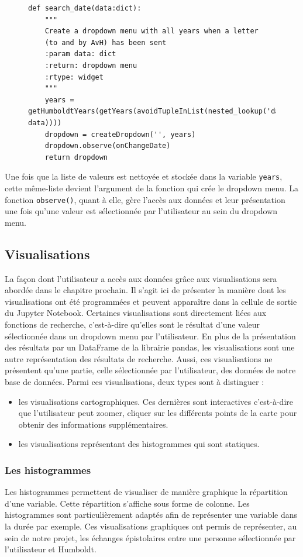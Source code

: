 \documentclass[a4paper, 12pt, twoside]{book}
\begin{document}
\begin{figure}[h!]
\begin{lstlisting}
def search_date(data:dict):
    """
    Create a dropdown menu with all years when a letter 
    (to and by AvH) has been sent
    :param data: dict 
    :return: dropdown menu
    :rtype: widget
    """
    years = getHumboldtYears(getYears(avoidTupleInList(nested_lookup('date', data))))
    dropdown = createDropdown('', years)
    dropdown.observe(onChangeDate)
    return dropdown
\end{lstlisting}
\vspace{-25pt}
\end{figure}

Une fois que la liste de valeurs est nettoyée et stockée dans la variable \texttt{years}, cette même-liste devient l'argument de la fonction qui crée le dropdown menu. La fonction \texttt{observe()}, quant à elle, gère l'accès aux données et leur présentation une fois qu'une valeur est sélectionnée par l'utilisateur au sein du dropdown menu. 

\subsection{Visualisations}
La façon dont l'utilisateur a accès aux données grâce aux visualisations sera abordée dans le chapitre prochain. Il s'agit ici de présenter la manière dont les visualisations ont été programmées et peuvent apparaître dans la cellule de sortie du Jupyter Notebook. 
Certaines visualisations sont directement liées aux fonctions de recherche, c'est-à-dire qu'elles sont le résultat d'une valeur sélectionnée dans un dropdown menu par l'utilisateur. En plus de la présentation des résultats par un DataFrame de la librairie pandas, les visualisations sont une autre représentation des résultats de recherche. Aussi, ces visualisations ne présentent qu'une partie, celle sélectionnée par l'utilisateur, des données de notre base de données.
Parmi ces visualisations, deux types sont à distinguer : 
\begin{itemize}
    \item les visualisations cartographiques. Ces dernières sont interactives c'est-à-dire que l'utilisateur peut zoomer, cliquer sur les différents points de la carte pour obtenir des informations supplémentaires.
    \item les visualisations représentant des histogrammes qui sont statiques.
\end{itemize}
\subsubsection{Les histogrammes}
Les histogrammes permettent de visualiser de manière graphique la répartition d'une variable. Cette répartition s'affiche sous forme de colonne. Les histogrammes sont particulièrement adaptés afin de représenter une variable dans la durée par exemple. Ces visualisations graphiques ont permis de représenter, au sein de notre projet, les échanges épistolaires entre une personne sélectionnée par l'utilisateur et Humboldt. 
\end{document}
